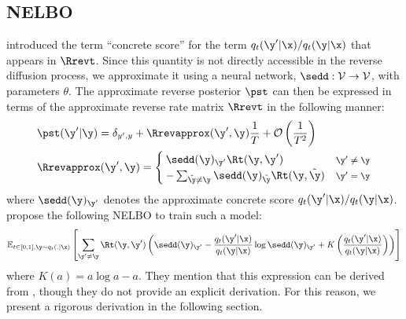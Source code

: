 \documentclass{article} %
\def\onehotset{\mathcal{V}}
\begin{document}
{\begin{appendices}
\subsection{NELBO}\label{app:subsec:sedd_nelbo}
\citet{meng2022concrete} introduced the term ``concrete score'' for the term $q_t(\y'|\x) / q_t(\y|\x)$ that appears in  $\Rrevt$. Since this quantity is not directly accessible in the reverse diffusion process, we approximate it using a neural network, $\sedd: \onehotset \to \onehotset$, with parameters $\theta$. The approximate reverse posterior $\pst$ can then be expressed in terms of the approximate reverse rate matrix $\Rrevt$ in the following manner:
\begin{align}    
    & \pst(\y' | \y) = \delta_{y', y} + \Rrevapprox(\y', \y) \frac{1}{T} + \mathcal{O}\left(\frac{1}{T^2}\right)\label{eqn:approx_reverse_rate}\\
    & \Rrevapprox(\y', \y) = 
        \begin{cases}
            \sedd(\y)_{\y'}\Rt(\y, \y') & \text{\footnotesize $\y' \neq \y$}\\
            - \sum_{\tilde \y \neq \y}\sedd(\y)_{\tilde \y}\Rt(\y, \tilde \y) & \text{\footnotesize $\y' = \y$}
        \end{cases}\label{eqn:approx_reverse_rate_property}
\end{align}
where $\sedd(\y)_{\y'}$ denotes the approximate concrete score $q_t(\y'|\x) / q_t(\y|\x)$.~\citet{lou2023discrete} propose the following NELBO to train such a model:
\begin{align}
    \mathbb{E}_{t \in [0, 1], \y \sim q_t(. | \x)} \left[
    \sum_{\y' \neq \y} \Rt(\y, \y') \left(
        \sedd(\y)_{\y'}
        - \frac{q_t(\y'|\x)}{q_t(\y | \x)}\log \sedd(\y)_{\y'}
        + K\left(\frac{q_t(\y'|\x)}{q_t(\y | \x)}\right) 
        \right) \right]
\end{align}
where $K(a) = a \log a - a $. They mention that this expression can be derived from \citet{benton2022denoising}, though they do not provide an explicit derivation. For this reason, we present a rigorous derivation in the following section.%


\end{appendices}}
\end{document}
